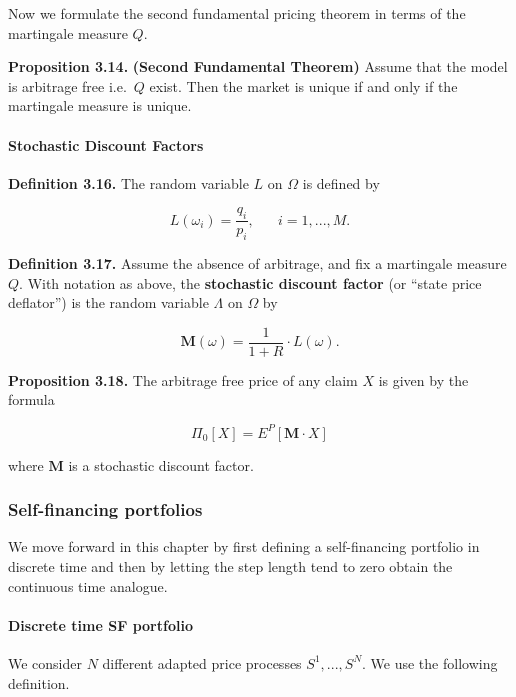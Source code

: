 \documentclass[
]{article}
\begin{document}
Now we formulate the second fundamental pricing theorem in terms of the
martingale measure \(Q\).

\textbf{Proposition 3.14.} \textbf{(Second Fundamental Theorem)} Assume
that the model is arbitrage free i.e.~\(Q\) exist. Then the market is
unique if and only if the martingale measure is unique.

\hypertarget{stochastic-discount-factors}{%
\paragraph{Stochastic Discount
Factors}\label{stochastic-discount-factors}}

\textbf{Definition 3.16.} The random variable \(L\) on \(\Omega\) is
defined by

\[
L(\omega_i)=\frac{q_i}{p_i},\hspace{20pt} i=1,...,M.
\]

\textbf{Definition 3.17.} Assume the absence of arbitrage, and fix a
martingale measure \(Q\). With notation as above, the \textbf{stochastic
discount factor} (or ``state price deflator'') is the random variable
\(\Lambda\) on \(\Omega\) by

\[
\mathbf{M}(\omega)=\frac{1}{1+R}\cdot L(\omega).\tag{3.19}
\]

\textbf{Proposition 3.18.} The arbitrage free price of any claim \(X\)
is given by the formula

\[
\Pi_0[X]=E^P[\mathbf{M}\cdot X]
\]

where \(\mathbf{M}\) is a stochastic discount factor.

\hypertarget{self-financing-portfolios}{%
\subsubsection{Self-financing
portfolios}\label{self-financing-portfolios}}

We move forward in this chapter by first defining a self-financing
portfolio in discrete time and then by letting the step length tend to
zero obtain the continuous time analogue.

\hypertarget{discrete-time-sf-portfolio}{%
\paragraph{Discrete time SF
portfolio}\label{discrete-time-sf-portfolio}}

We consider \(N\) different adapted price processes \(S^1,...,S^N\). We
use the following definition.
\end{document}
